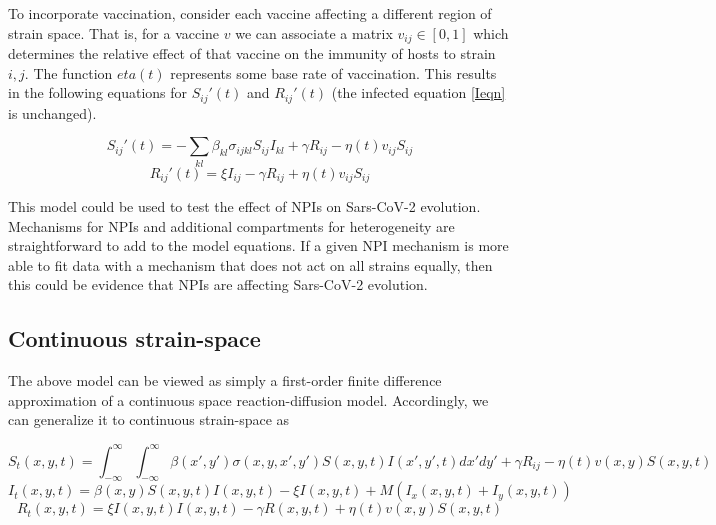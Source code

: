 \documentclass{article}
\begin{document}
To incorporate vaccination, consider each vaccine affecting a different region of strain space. That is, for a vaccine $v$ we can associate a matrix $v_{ij} \in [0,1]$ which determines the relative effect of that vaccine on the immunity of hosts to strain $i,j$. The function $eta(t)$ represents some base rate of vaccination. This results in the following equations for $S_{ij}'(t)$ and $ R_{ij}'(t) $ (the infected equation \ref{Ieqn} is unchanged).


\begin{equation}
    S_{ij}'(t) = -\sum_{kl} \beta_{kl} \sigma_{ijkl} S_{ij} I_{kl} + \gamma R_{ij} -  \eta(t) v_{ij} S_{ij} \label{Seqn}
\end{equation}
\begin{equation}
    R_{ij}'(t) = \xi I_{ij} - \gamma R_{ij} + \eta(t) v_{ij} S_{ij} \label{Reqn}
\end{equation}


This model could be used to test the effect of NPIs on Sars-CoV-2 evolution. Mechanisms for NPIs and additional compartments for heterogeneity are straightforward to add to the model equations. If a given NPI mechanism is more able to fit data with a mechanism that does not act on all strains equally, then this could be evidence that NPIs are affecting Sars-CoV-2 evolution. 

\subsection{Continuous strain-space}

The above model can be viewed as simply a first-order finite difference approximation of a continuous space reaction-diffusion model. Accordingly, we can generalize it to continuous strain-space as
 
\begin{equation}
    S_t(x,y,t) = \int_{-\infty}^{\infty} \int_{-\infty}^{\infty} \beta(x',y') \sigma(x,y,x', y') S(x,y,t) I(x',y',t) dx' dy' + \gamma R_{ij} -  \eta(t) v(x,y) S(x,y,t)\label{Seqn_cts}
\end{equation}
\begin{equation}
    I_t(x,y,t) = \beta(x,y) S(x,y,t) I(x,y,t)- \xi I(x,y,t) + M \left(I_x(x,y,t)  + I_y(x,y,t)  \right) \label{Ieqn_cts}    
\end{equation}
\begin{equation}
    R_t(x,y,t) = \xi I(x,y,t)I(x,y,t) - \gamma R(x,y,t) + \eta(t) v(x,y) S(x,y,t) \label{Reqn_cts}
\end{equation}
\end{document}
